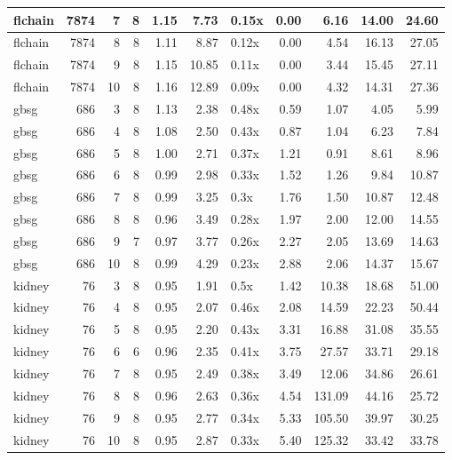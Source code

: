 \begin{table}[ht]
\begin{tabular}{lrrrrrlrrrr}
   \hline
flchain & 7874 &   7 &   8 & 1.15 & 7.73 & 0.15x & 0.00 & 6.16 & 14.00 & 24.60 \\ 
   \hline
flchain & 7874 &   8 &   8 & 1.11 & 8.87 & 0.12x & 0.00 & 4.54 & 16.13 & 27.05 \\ 
   \hline
flchain & 7874 &   9 &   8 & 1.15 & 10.85 & 0.11x & 0.00 & 3.44 & 15.45 & 27.11 \\ 
   \hline
flchain & 7874 &  10 &   8 & 1.16 & 12.89 & 0.09x & 0.00 & 4.32 & 14.31 & 27.36 \\ 
   \hline
gbsg & 686 &   3 &   8 & 1.13 & 2.38 & 0.48x & 0.59 & 1.07 & 4.05 & 5.99 \\ 
   \hline
gbsg & 686 &   4 &   8 & 1.08 & 2.50 & 0.43x & 0.87 & 1.04 & 6.23 & 7.84 \\ 
   \hline
gbsg & 686 &   5 &   8 & 1.00 & 2.71 & 0.37x & 1.21 & 0.91 & 8.61 & 8.96 \\ 
   \hline
gbsg & 686 &   6 &   8 & 0.99 & 2.98 & 0.33x & 1.52 & 1.26 & 9.84 & 10.87 \\ 
   \hline
gbsg & 686 &   7 &   8 & 0.99 & 3.25 & 0.3x & 1.76 & 1.50 & 10.87 & 12.48 \\ 
   \hline
gbsg & 686 &   8 &   8 & 0.96 & 3.49 & 0.28x & 1.97 & 2.00 & 12.00 & 14.55 \\ 
   \hline
gbsg & 686 &   9 &   7 & 0.97 & 3.77 & 0.26x & 2.27 & 2.05 & 13.69 & 14.63 \\ 
   \hline
gbsg & 686 &  10 &   8 & 0.99 & 4.29 & 0.23x & 2.88 & 2.06 & 14.37 & 15.67 \\ 
   \hline
kidney &  76 &   3 &   8 & 0.95 & 1.91 & 0.5x & 1.42 & 10.38 & 18.68 & 51.00 \\ 
   \hline
kidney &  76 &   4 &   8 & 0.95 & 2.07 & 0.46x & 2.08 & 14.59 & 22.23 & 50.44 \\ 
   \hline
kidney &  76 &   5 &   8 & 0.95 & 2.20 & 0.43x & 3.31 & 16.88 & 31.08 & 35.55 \\ 
   \hline
kidney &  76 &   6 &   6 & 0.96 & 2.35 & 0.41x & 3.75 & 27.57 & 33.71 & 29.18 \\ 
   \hline
kidney &  76 &   7 &   8 & 0.95 & 2.49 & 0.38x & 3.49 & 12.06 & 34.86 & 26.61 \\ 
   \hline
kidney &  76 &   8 &   8 & 0.96 & 2.63 & 0.36x & 4.54 & 131.09 & 44.16 & 25.72 \\ 
   \hline
kidney &  76 &   9 &   8 & 0.95 & 2.77 & 0.34x & 5.33 & 105.50 & 39.97 & 30.25 \\ 
   \hline
kidney &  76 &  10 &   8 & 0.95 & 2.87 & 0.33x & 5.40 & 125.32 & 33.42 & 33.78 \\ 
   \hline
\end{tabular}
\end{table}
